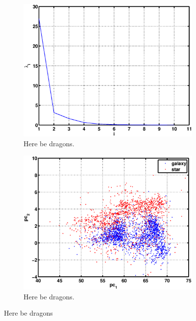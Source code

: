 \documentclass[a4paper, 11pt]{article}
\begin{document}
\begin{figure}[H] %
    \centering
    \begin{subfigure}[b]{0.49\textwidth}
    \includegraphics[width=\textwidth]{figures/question4_1}
        \caption{Here be dragons.}\label{fig:question4_1}
    \end{subfigure}
    \begin{subfigure}[b]{0.49\textwidth}
        \includegraphics[width=\textwidth]{figures/question4_2}
        \caption{Here be dragons.}\label{fig:question4_2}
    \end{subfigure}
    \caption{Here be dragons}\label{fig:question4}
\end{figure}
\end{document}
